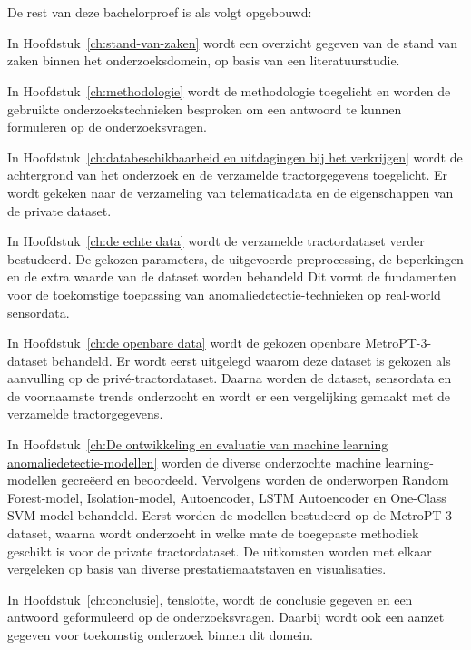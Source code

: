 \section{}%
\label{sec:opzet-bachelorproef}


De rest van deze bachelorproef is als volgt opgebouwd:

In Hoofdstuk~\ref{ch:stand-van-zaken} wordt een overzicht gegeven van de stand van zaken binnen het onderzoeksdomein, op basis van een literatuurstudie.

In Hoofdstuk~\ref{ch:methodologie} wordt de methodologie toegelicht en worden de gebruikte onderzoekstechnieken besproken om een antwoord te kunnen formuleren op de onderzoeksvragen.


In Hoofdstuk~\ref{ch:databeschikbaarheid en uitdagingen bij het verkrijgen} wordt de achtergrond van het onderzoek en de verzamelde tractorgegevens toegelicht. Er wordt gekeken naar de verzameling van telematicadata en de eigenschappen van de private dataset.

In Hoofdstuk~\ref{ch:de echte data} wordt de verzamelde tractordataset verder bestudeerd. De gekozen parameters, de uitgevoerde preprocessing, de beperkingen en de extra waarde van de dataset worden behandeld Dit vormt de fundamenten voor de toekomstige toepassing van anomaliedetectie-technieken op real-world sensordata.

In Hoofdstuk~\ref{ch:de openbare data} wordt de gekozen openbare MetroPT-3-dataset behandeld. Er wordt eerst uitgelegd waarom deze dataset is gekozen als aanvulling op de privé-tractordataset. Daarna worden de dataset, sensordata en de voornaamste trends onderzocht en wordt er een vergelijking gemaakt met de verzamelde tractorgegevens.

In Hoofdstuk~\ref{ch:De ontwikkeling en evaluatie van machine learning anomaliedetectie-modellen} worden de diverse onderzochte machine learning-modellen gecreëerd en beoordeeld. Vervolgens worden de onderworpen Random Forest-model, Isolation-model, Autoencoder, LSTM Autoencoder en One-Class SVM-model behandeld. Eerst worden de modellen bestudeerd op de MetroPT-3-dataset, waarna wordt onderzocht in welke mate de toegepaste methodiek geschikt is voor de private tractordataset. De uitkomsten worden met elkaar vergeleken op basis van diverse prestatiemaatstaven en visualisaties.

In Hoofdstuk~\ref{ch:conclusie}, tenslotte, wordt de conclusie gegeven en een antwoord geformuleerd op de onderzoeksvragen. Daarbij wordt ook een aanzet gegeven voor toekomstig onderzoek binnen dit domein.